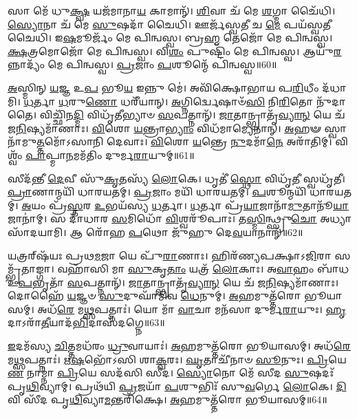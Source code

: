 𑌸𑌾 𑌮𑍇᳴ 𑌧𑍁\-\ul{𑌕𑍍𑌷𑍍𑌵} 𑌯𑌜᳴𑌮𑌾𑌨𑌾\-\ul{𑌯} 𑌕𑌾𑌮𑌾𑌨𑍍᳴।
\-\ul{𑌶𑌿}\-𑌵𑌾 𑌚᳴ 𑌮𑍇 \ul{𑌶}\-𑌗𑍍𑌮𑌾 𑌚𑍈᳴𑌧𑌿।
\-\ul{𑌸𑍍𑌯𑍋}\-𑌨𑌾 𑌚᳴ 𑌮𑍇 \ul{𑌸𑍁}\-𑌷𑌦𑌾᳴ 𑌚𑍈𑌧𑌿।
𑌊𑌰𑍍𑌜᳴𑌸𑍍𑌵𑌤𑍀 𑌚 \ul{𑌮𑍇} 𑌪𑌯᳴𑌸𑍍𑌵𑌤𑍀 𑌚𑍈𑌧𑌿।
𑌇\-\ul{𑌷}\-𑌮𑍂𑌰𑍍𑌜𑌂᳴ 𑌮𑍇 𑌪𑌿𑌨𑍍𑌵𑌸𑍍𑌵।
𑌬𑍍𑌰\-\ul{𑌹𑍍𑌮} 𑌤𑍇𑌜𑍋᳴ 𑌮𑍇 𑌪𑌿𑌨𑍍𑌵𑌸𑍍𑌵।
\-\ul{𑌕𑍍𑌷}\-𑌤𑍍𑌰𑌮𑍋𑌜𑍋᳴ 𑌮𑍇 𑌪𑌿𑌨𑍍𑌵𑌸𑍍𑌵।
𑌵𑌿\-\ul{𑌶𑌂} 𑌪𑍁𑌷𑍍𑌟𑌿𑌂᳴ 𑌮𑍇 𑌪𑌿𑌨𑍍𑌵𑌸𑍍𑌵।
𑌆𑌯𑍁᳴\-\ul{𑌰}\-𑌨𑍍𑌨𑌾𑌦𑍍𑌯𑌂᳴ 𑌮𑍇 𑌪𑌿𑌨𑍍𑌵𑌸𑍍𑌵।
\-\ul{𑌪𑍍𑌰}\-𑌜𑌾𑌂 \ul{𑌪}\-𑌶𑍂𑌨𑍍𑌮𑍇᳴ 𑌪𑌿𑌨𑍍𑌵𑌸𑍍𑌵॥60॥

\-\ul{𑌅}\-𑌸𑍍𑌮𑌿𑌨𑍍 \ul{𑌯}\-𑌜𑍍𑌞 𑌉\-\ul{𑌪} 𑌭𑍂\-\ul{𑌯} 𑌇𑌨𑍍𑌨𑍁 𑌮𑍇॑।
𑌅𑌵𑌿᳴𑌕𑍍𑌷𑍋𑌭𑌾𑌯 𑌪\-\ul{𑌰𑌿}\-𑌧𑍀𑌂 𑌦᳴𑌧𑌾𑌮𑌿।
\-\ul{𑌧}\-𑌰𑍍𑌤𑌾 \ul{𑌧}\-𑌰𑍁\-\ul{𑌣𑍋} 𑌧𑌰𑍀᳴𑌯𑌾𑌨𑍍।
\-\ul{𑌅}\-𑌗𑍍𑌨𑌿𑌰𑍍𑌦𑍍𑌵𑍇𑌷𑌾𑍞᳴\-\ul{𑌸𑌿} 𑌨𑌿\-\ul{𑌰𑌿}\-𑌤𑍋 𑌨𑍁᳴𑌦𑌾𑌤𑍈।
𑌵𑌿𑌚𑍍𑌛𑌿᳴𑌨\-\ul{𑌦𑍍𑌮𑌿} 𑌵𑌿𑌧𑍃᳴𑌤𑍀𑌭𑍍𑌯𑌾𑍞 \ul{𑌸}\-𑌪𑌤𑍍𑌨𑌾𑌨𑍍᳴।
\-\ul{𑌜𑌾}\-𑌤𑌾𑌨𑍍𑌭𑍍𑌰𑌾𑌤𑍃᳴\-\ul{𑌵𑍍𑌯𑌾}\-\-\ul{𑌨𑍍} 𑌯𑍇 𑌚᳴ 𑌜\-\ul{𑌨𑌿}\-𑌷𑍍𑌯𑌮𑌾᳴𑌣𑌾𑌃।
\-\ul{𑌵𑌿}\-𑌶𑍋 \ul{𑌯}\-𑌨𑍍𑌤𑍍𑌰𑌾\-\ul{𑌭𑍍𑌯𑌾𑌂} 𑌵𑌿𑌧᳴𑌮𑌾𑌮𑍍𑌯𑍇𑌨𑌾𑌨𑍍।
\-\ul{𑌅}\-𑌹𑍟 𑌸𑍍𑌵𑌾𑌨𑌾᳴𑌮𑍁\-\ul{𑌤𑍍𑌤}\-𑌮𑍋᳴\-𑌽𑌸𑌾𑌨𑌿 𑌦𑍇𑌵𑌾𑌃।
\-\ul{𑌵𑌿}\-𑌶𑍋 \ul{𑌯}\-𑌨𑍍𑌤𑍍𑌰𑍇 \ul{𑌨𑍁}\-𑌦𑌮𑌾᳴\-\ul{𑌨𑍇} 𑌅𑌰𑌾᳴𑌤𑌿𑌮𑍍।
𑌵𑌿𑌶𑍍𑌵𑌂᳴ \ul{𑌪𑌾}\-𑌪𑍍𑌮𑌾\-\ul{𑌨}\-𑌮𑌮᳴𑌤𑌿𑌂 𑌦𑍁𑌰𑍍𑌮\-\ul{𑌰𑌾}\-𑌯𑍁𑌮𑍍॥61॥

𑌸𑍀𑌦᳴𑌨𑍍𑌤𑍀 \ul{𑌦𑍇}\-𑌵𑍀 𑌸𑍁᳴\-\ul{𑌕𑍃}\-𑌤𑌸𑍍𑌯᳴ \ul{𑌲𑍋}\-𑌕𑍇।
𑌧𑍃𑌤𑍀॑ \ul{𑌸𑍍𑌥𑍋} 𑌵𑌿𑌧𑍃᳴\-\ul{𑌤𑍀} 𑌸𑍍𑌵𑌧𑍃᳴𑌤𑍀।
\-\ul{𑌪𑍍𑌰𑌾}\-𑌣𑌾𑌨𑍍𑌮𑌯𑌿᳴ 𑌧𑌾𑌰𑌯𑌤𑌮𑍍।
\-\ul{𑌪𑍍𑌰}\-𑌜𑌾𑌂 𑌮𑌯𑌿᳴ 𑌧𑌾𑌰𑌯𑌤𑌮𑍍।
\-\ul{𑌪}\-𑌶𑍂𑌨𑍍𑌮𑌯𑌿᳴ 𑌧𑌾𑌰𑌯𑌤𑌮𑍍।
\-\ul{𑌅}\-𑌯𑌂 𑌪𑍍𑌰᳴\-\ul{𑌸𑍍𑌤}\-𑌰 \ul{𑌉}\-𑌭𑌯᳴𑌸𑍍𑌯 \ul{𑌧}\-𑌰𑍍𑌤𑌾।
\-\ul{𑌧}\-𑌰𑍍𑌤𑌾 𑌪𑍍𑌰᳴\-\ul{𑌯𑌾}\-𑌜𑌾𑌨𑌾᳴\-\ul{𑌮𑍁}\-𑌤𑌾𑌨𑍂᳴\-\ul{𑌯𑌾}\-𑌜𑌾𑌨𑌾॑𑌮𑍍।
𑌸 𑌦𑌾᳴𑌧𑌾𑌰 \ul{𑌸}\-𑌮𑌿𑌧𑍋᳴ \ul{𑌵𑌿}\-𑌶𑍍𑌵𑌰𑍂᳴𑌪𑌾𑌃।
𑌤\-\ul{𑌸𑍍𑌮𑌿}\-𑌨𑍍𑌥𑍍𑌸𑍍𑌰𑍁\-\ul{𑌚𑍋} 𑌅𑌧𑍍𑌯𑌾 𑌸𑌾᳴𑌦𑌯𑌾𑌮𑌿।
𑌆 𑌰𑍋᳴𑌹 \ul{𑌪}\-𑌥𑍋 𑌜𑍁᳴𑌹𑍁 𑌦𑍇\-\ul{𑌵}\-𑌯𑌾𑌨𑌾𑌨𑍍᳴॥62॥

𑌯𑌤𑍍𑌰𑌰𑍍‌\mbox{}𑌷᳴𑌯𑌃 𑌪𑍍𑌰𑌥\-\ul{𑌮}\-𑌜𑌾 𑌯𑍇 𑌪𑍁᳴\-\ul{𑌰𑌾}\-𑌣𑌾𑌃।
𑌹𑌿𑌰᳴𑌣𑍍𑌯𑌪𑌕𑍍𑌷𑌾\-𑌽\-\ul{𑌜𑌿}\-𑌰𑌾 𑌸𑌮𑍍𑌭𑍃᳴𑌤𑌾𑌙𑍍𑌗𑌾।
𑌵𑌹𑌾᳴𑌸𑌿 𑌮𑌾 \ul{𑌸𑍁}\-𑌕𑍃\-\ul{𑌤𑌾𑌂} 𑌯𑌤𑍍𑌰᳴ \ul{𑌲𑍋}\-𑌕𑌾𑌃।
𑌅\-\ul{𑌵𑌾}\-𑌹𑌂 𑌬𑌾᳴𑌧 𑌉\-\ul{𑌪}\-𑌭𑍃𑌤𑌾᳴ \ul{𑌸}\-𑌪𑌤𑍍𑌨𑌾𑌨𑍍᳴।
\-\ul{𑌜𑌾}\-𑌤𑌾𑌨𑍍𑌭𑍍𑌰𑌾𑌤𑍃᳴\-\ul{𑌵𑍍𑌯𑌾}\-\-\ul{𑌨𑍍} 𑌯𑍇 𑌚᳴ 𑌜\-\ul{𑌨𑌿}\-𑌷𑍍𑌯𑌮𑌾᳴𑌣𑌾𑌃।
𑌦𑍋𑌹𑍈᳴ \ul{𑌯}\-𑌜𑍍𑌞𑍞 \ul{𑌸𑍁}\-𑌦𑍁𑌘𑌾᳴𑌮𑌿𑌵 \ul{𑌧𑍇}\-𑌨𑍁𑌮𑍍।
\-\ul{𑌅}\-𑌹𑌮𑍁𑌤𑍍𑌤᳴𑌰𑍋 𑌭𑍂𑌯𑌾𑌸𑌮𑍍।
𑌅𑌧᳴\-\ul{𑌰𑍇} 𑌮\-\ul{𑌥𑍍𑌸}\-𑌪𑌤𑍍𑌨𑌾𑌃॑।
𑌯𑍋 𑌮𑌾᳴ \ul{𑌵𑌾}\-𑌚𑌾 𑌮𑌨᳴𑌸𑌾 𑌦𑍁𑌰𑍍𑌮\-\ul{𑌰𑌾}\-𑌯𑍁𑌃।
\-\ul{𑌹𑍃}\-𑌦𑌾\-𑌽𑌰𑌾᳴\-\ul{𑌤𑍀}\-𑌯𑌾𑌦᳴\-\ul{𑌭𑌿}\-𑌦𑌾𑌸᳴𑌦𑌗𑍍𑌨𑍇॥63॥

\-\ul{𑌇}\-𑌦𑌮᳴𑌸𑍍𑌯 \ul{𑌚𑌿}\-𑌤𑍍𑌤𑌮𑌧᳴𑌰𑌂 \ul{𑌧𑍍𑌰𑍁}\-𑌵𑌾𑌯𑌾𑌃॑।
\-\ul{𑌅}\-𑌹𑌮𑍁𑌤𑍍𑌤᳴𑌰𑍋 𑌭𑍂𑌯𑌾𑌸𑌮𑍍।
𑌅𑌧᳴\-\ul{𑌰𑍇} 𑌮\-\ul{𑌥𑍍𑌸}\-𑌪𑌤𑍍𑌨𑌾𑌃॑।
\-\ul{𑌋}\-\-\ul{𑌷}\-𑌭𑍋᳴𑌽𑌸𑌿 𑌶𑌾\-\ul{𑌕𑍍𑌵}\-𑌰𑌃।
\-\ul{𑌘𑍃}\-𑌤𑌾𑌚𑍀᳴𑌨𑌾𑍞 \ul{𑌸𑍂}\-𑌨𑍁𑌃।
\-\ul{𑌪𑍍𑌰𑌿}\-𑌯𑍇\-\ul{𑌣} 𑌨𑌾𑌮𑍍𑌨𑌾॑ \ul{𑌪𑍍𑌰𑌿}\-𑌯𑍇 𑌸𑌦᳴𑌸𑌿 𑌸𑍀𑌦।
\-\ul{𑌸𑍍𑌯𑍋}\-𑌨𑍋 𑌮𑍇᳴ 𑌸𑍀𑌦 \ul{𑌸𑍁}\-𑌷𑌦𑌃᳴ 𑌪𑍃\-\ul{𑌥𑌿}\-𑌵𑍍𑌯𑌾𑌮𑍍।
𑌪𑍍𑌰𑌥᳴𑌯𑌿 \ul{𑌪𑍍𑌰}\-𑌜𑌯𑌾᳴ \ul{𑌪}\-𑌶𑍁𑌭𑌿𑌃᳴ 𑌸𑍁\-\ul{𑌵}\-𑌰𑍍𑌗𑍇 \ul{𑌲𑍋}\-𑌕𑍇।
\-\ul{𑌦𑌿}\-𑌵𑌿 𑌸𑍀᳴𑌦 𑌪𑍃\-\ul{𑌥𑌿}\-𑌵𑍍𑌯𑌾\-\ul{𑌮}\-𑌨𑍍𑌤𑌰𑌿᳴𑌕𑍍𑌷𑍇।
\-\ul{𑌅}\-𑌹𑌮𑍁𑌤𑍍𑌤᳴𑌰𑍋 𑌭𑍂𑌯𑌾𑌸𑌮𑍍॥64॥

